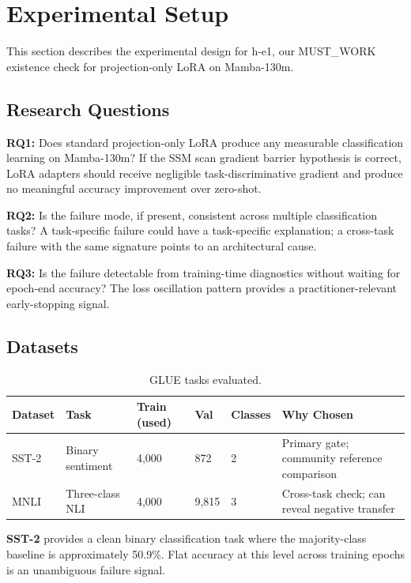 \section{Experimental Setup}
\label{sec:experiments}

This section describes the experimental design for h-e1, our MUST\_WORK existence check for projection-only LoRA on Mamba-130m.

\subsection{Research Questions}

\textbf{RQ1:} Does standard projection-only LoRA produce any measurable classification learning on Mamba-130m? If the SSM scan gradient barrier hypothesis is correct, LoRA adapters should receive negligible task-discriminative gradient and produce no meaningful accuracy improvement over zero-shot.

\textbf{RQ2:} Is the failure mode, if present, consistent across multiple classification tasks? A task-specific failure could have a task-specific explanation; a cross-task failure with the same signature points to an architectural cause.

\textbf{RQ3:} Is the failure detectable from training-time diagnostics without waiting for epoch-end accuracy? The loss oscillation pattern provides a practitioner-relevant early-stopping signal.

\subsection{Datasets}

\begin{table}[h]
\centering
\caption{GLUE tasks evaluated.}
\label{tab:datasets}
\begin{tabular}{@{}llllll@{}}
\toprule
\textbf{Dataset} & \textbf{Task} & \textbf{Train (used)} & \textbf{Val} & \textbf{Classes} & \textbf{Why Chosen} \\
\midrule
SST-2 & Binary sentiment & 4,000 & 872 & 2 & Primary gate; community reference comparison \\
MNLI & Three-class NLI & 4,000 & 9,815 & 3 & Cross-task check; can reveal negative transfer \\
\bottomrule
\end{tabular}
\end{table}

\textbf{SST-2} provides a clean binary classification task where the majority-class baseline is approximately 50.9\%. Flat accuracy at this level across training epochs is an unambiguous failure signal.

